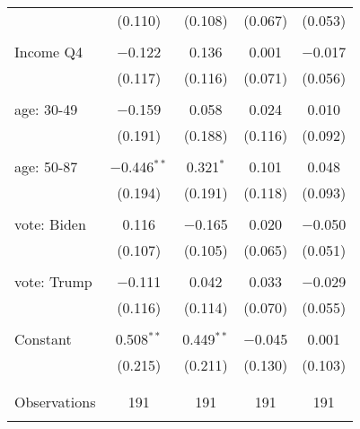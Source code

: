 \begin{tabular}{@{\extracolsep{5pt}}lcccc}
  & (0.110) & (0.108) & (0.067) & (0.053) \\ 
  & & & & \\ 
 Income Q4 & $-$0.122 & 0.136 & 0.001 & $-$0.017 \\ 
  & (0.117) & (0.116) & (0.071) & (0.056) \\ 
  & & & & \\ 
 age: 30-49 & $-$0.159 & 0.058 & 0.024 & 0.010 \\ 
  & (0.191) & (0.188) & (0.116) & (0.092) \\ 
  & & & & \\ 
 age: 50-87 & $-$0.446$^{**}$ & 0.321$^{*}$ & 0.101 & 0.048 \\ 
  & (0.194) & (0.191) & (0.118) & (0.093) \\ 
  & & & & \\ 
 vote: Biden & 0.116 & $-$0.165 & 0.020 & $-$0.050 \\ 
  & (0.107) & (0.105) & (0.065) & (0.051) \\ 
  & & & & \\ 
 vote: Trump & $-$0.111 & 0.042 & 0.033 & $-$0.029 \\ 
  & (0.116) & (0.114) & (0.070) & (0.055) \\ 
  & & & & \\ 
 Constant & 0.508$^{**}$ & 0.449$^{**}$ & $-$0.045 & 0.001 \\ 
  & (0.215) & (0.211) & (0.130) & (0.103) \\ 
  & & & & \\ 
\hline \\[-1.8ex] 

Observations & 191 & 191 & 191 & 191 \\ 
\hline 
\hline \\[-1.8ex] 
\end{tabular} 